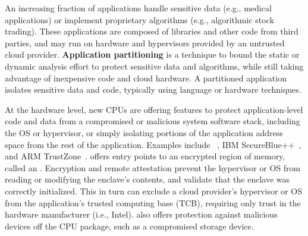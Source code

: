 

An increasing fraction of applications handle sensitive data (e.g., medical applications)
or implement proprietary algorithms (e.g., algorithmic stock trading).
These applications are composed of 
libraries and other code from third parties, and may run on 
hardware and hypervisors provided by an untrusted cloud provider.
{\bf Application partitioning} is a technique to 
bound the 
static or dynamic analysis effort to protect sensitive data and algorithms,
while still taking advantage of inexpensive code and cloud hardware.
A partitioned application isolates sensitive data and code, typically using
language or hardware techniques.


At the hardware level, 
new CPUs are offering features to protect application-level code and data
from a  compromised or malicious system software stack,
including the OS or hypervisor, or simply isolating portions of the 
application address space from the rest of the application.
Examples include \intel{} \sgx{}~\citep{intelsgx}, 
IBM SecureBlue++~\citep{secureblue++}, and ARM TrustZone~\citep{trustzone}.
\sgx{} offers %
entry points to an encrypted region of memory, called an .
Encryption and remote attestation 
prevent the hypervisor or OS from reading or modifying the enclave's contents,
and validate that the enclave was correctly initialized.
This in turn
can exclude 
a cloud provider's hypervisor or OS from the application's trusted computing base (TCB),
requiring only trust in the hardware manufacturer (i.e., Intel).
\sgx{} also offers protection against malicious devices off the CPU package,
such as a compromised storage device.

